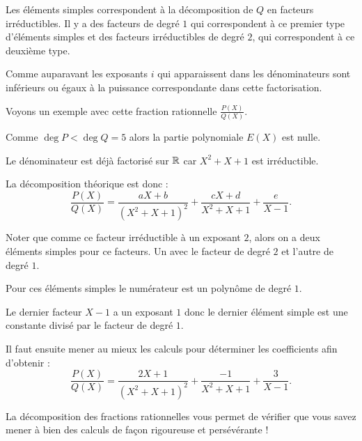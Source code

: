 Les éléments simples correspondent à la décomposition de $Q$ en facteurs irréductibles.
Il y a des facteurs de degré $1$ qui correspondent à ce premier type d'éléments simples
et des facteurs irréductibles de degré $2$, qui correspondent à ce deuxième type.


\change

Comme auparavant les exposants $i$ qui apparaissent dans les dénominateurs sont inférieurs ou égaux à la 
puissance correspondante dans cette factorisation.
% 

\diapo

Voyons un exemple avec cette fraction rationnelle 
$\frac{P(X)}{Q(X)}$.

\change

Comme $\deg P < \deg Q=5$ alors la partie polynomiale $E(X)$ est nulle.

\change

Le dénominateur est déjà factorisé sur $\mathbb{R}$ car $X^2+X+1$ est irréductible.

\change

La décomposition théorique est donc :
$$\frac{P(X)}{Q(X)} = \frac{aX+b}{(X^2+X+1)^2}+\frac{cX+d}{X^2+X+1}+\frac{e}{X-1}.$$

Noter que comme ce facteur irréductible à un exposant $2$,
alors on a deux éléments simples pour ce facteurs. Un avec le facteur de degré $2$
et l'autre de degré $1$.

Pour ces éléments simples le numérateur est un polynôme de degré $1$.

Le dernier facteur $X-1$ a un exposant $1$ donc le dernier élément simple 
est une constante divisé par le facteur de degré $1$.


\change

Il faut ensuite mener au mieux les calculs pour déterminer les coefficients afin d'obtenir :
$$\frac{P(X)}{Q(X)} = \frac{2X+1}{(X^2+X+1)^2}+\frac{-1}{X^2+X+1}+\frac{3}{X-1}.$$

\diapo

La décomposition des fractions rationnelles vous permet de vérifier 
que vous savez mener à bien des calculs de façon rigoureuse et persévérante !

